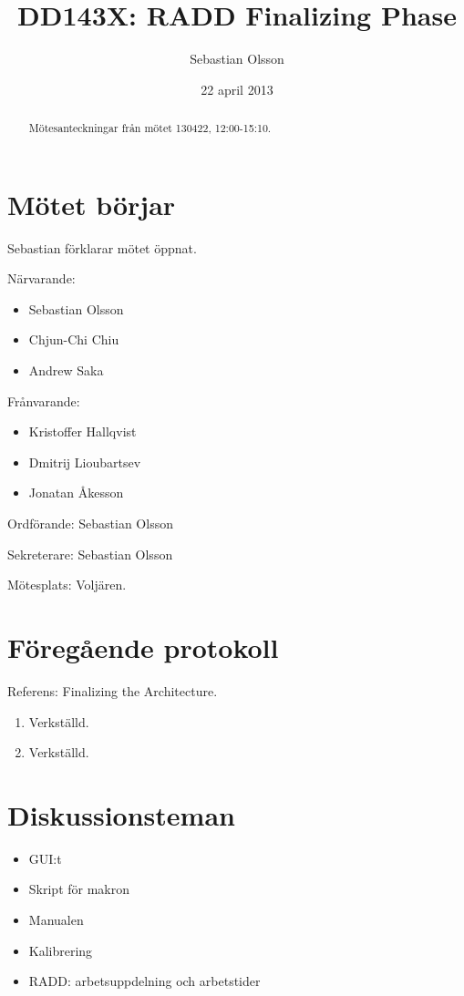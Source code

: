 \documentclass[a4paper,12pt]{article}
\author{Sebastian Olsson}
\title{DD143X: RADD Finalizing Phase}
\date{22 april 2013}
\begin{document}
\maketitle
\begin{abstract}
    Mötesanteckningar från mötet 130422, 12:00-15:10.
\end{abstract}

\section{Mötet börjar}
Sebastian förklarar mötet öppnat.

Närvarande:
\begin{itemize}
\item Sebastian Olsson
\item Chjun-Chi Chiu
\item Andrew Saka
\end{itemize}
Frånvarande:
\begin{itemize}
\item Kristoffer Hallqvist
\item Dmitrij Lioubartsev
\item Jonatan Åkesson
\end{itemize}

Ordförande: Sebastian Olsson

Sekreterare: Sebastian Olsson

Mötesplats: Voljären.

\section{Föregående protokoll}
Referens: Finalizing the Architecture.

\begin{enumerate}
\item Verkställd.
\item Verkställd.
\end{enumerate}

\section{Diskussionsteman}
\begin{itemize}
\item GUI:t
\item Skript för makron
\item Manualen
\item Kalibrering
\item RADD: arbetsuppdelning och arbetstider
\end{itemize}
\end{document}
